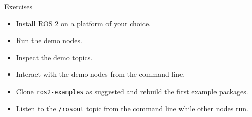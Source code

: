 \begin{frame}{Exercises}
  \begin{itemize}
    \item Install ROS 2 on a platform of your choice.
    \item Run the \href{https://docs.ros.org/en/humble/Installation/Ubuntu-Install-Debians.html\#try-some-examples}{\color{blue}\underline{demo nodes}}.
    \item Inspect the demo topics.
    \item Interact with the demo nodes from the command line.
    \item Clone \href{https://github.com/IntelligentSystemsLabUTV/ros2-examples}{\color{blue}\underline{\texttt{ros2-examples}}} as suggested and rebuild the first example packages.
    \item Listen to the \texttt{/rosout} topic from the command line while other nodes run.
  \end{itemize}
\end{frame}
